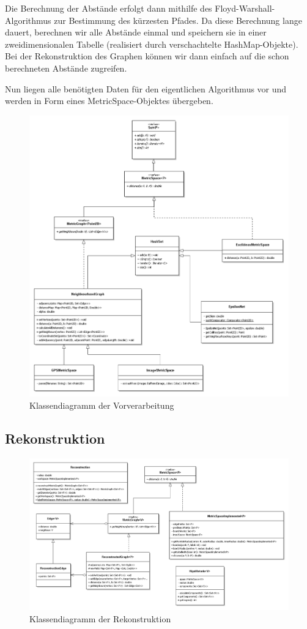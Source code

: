 \documentclass[parskip=half,
 fontsize=12pt, bibtotoc,
 titlepage, ngerman]
 {article}
\begin{document}
Die Berechnung der Abstände erfolgt dann mithilfe des Floyd-Warshall-Algorithmus zur Bestimmung des kürzesten Pfades. Da diese Berechnung lange dauert, berechnen wir alle Abstände einmal und speichern sie in einer zweidimensionalen Tabelle (realisiert durch verschachtelte HashMap-Objekte). Bei der Rekonstruktion des Graphen können wir dann einfach auf die schon berechneten Abstände zugreifen.

Nun liegen alle benötigten Daten für den eigentlichen Algorithmus vor und werden in Form eines MetricSpace-Objektes übergeben.

\begin{figure}[h]
\centering
\includegraphics[scale=0.5]{preprocessing.png}
\caption{Klassendiagramm der Vorverarbeitung}
\end{figure}

\subsection{Rekonstruktion}

\begin{figure}[h]
\centering
\includegraphics[scale=0.5]{main.png}
\caption{Klassendiagramm der Rekonstruktion}
\end{figure}
\end{document}
